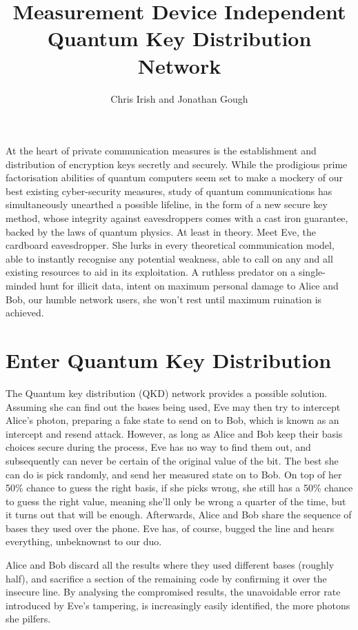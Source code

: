 \documentclass[journal]{vgtc}
\title{Measurement Device Independent Quantum Key Distribution Network}
\author{Chris Irish and Jonathan Gough}
\begin{document}

\maketitle

At the heart of private communication measures is the establishment and distribution of encryption keys secretly and securely. While the prodigious prime factorisation abilities of quantum computers seem set to make a mockery of our best existing cyber-security measures, study of quantum communications has simultaneously unearthed a possible lifeline, in the form of a new secure key method, whose integrity against eavesdroppers comes with a cast iron guarantee, backed by the laws of quantum physics. At least in theory. Meet Eve, the cardboard eavesdropper. She lurks in every theoretical communication model, able to instantly recognise any potential weakness, able to call on any and all existing resources to aid in its exploitation. A ruthless predator on a single-minded hunt for illicit data, intent on maximum personal damage to Alice and Bob, our humble network users, she won't rest until maximum ruination is achieved.


\section{Enter Quantum Key Distribution}


The Quantum key distribution (QKD) network provides a possible solution. Assuming she can find out the bases being used, Eve may then try to intercept Alice's photon, preparing a fake state to send on to Bob, which is known as an intercept and resend attack. However, as long as Alice and Bob keep their basis choices secure during the process, Eve has no way to find them out, and subsequently can never be certain of the original value of the bit. The best she can do is pick randomly, and send her measured state on to Bob. On top of her 50\% chance to guess the right basis, if she picks wrong, she still has a 50\% chance to guess the right value, meaning she'll only be wrong a quarter of the time, but it turns out that will be enough. Afterwards, Alice and Bob share the sequence of bases they used over the phone. Eve has, of course, bugged the line and hears everything, unbeknownst to our duo.

Alice and Bob discard all the results where they used different bases (roughly half), and sacrifice a section of the remaining code by confirming it over the insecure line. By analysing the compromised results, the unavoidable error rate introduced by Eve's tampering, is increasingly easily identified, the more photons she pilfers.
\end{document}
